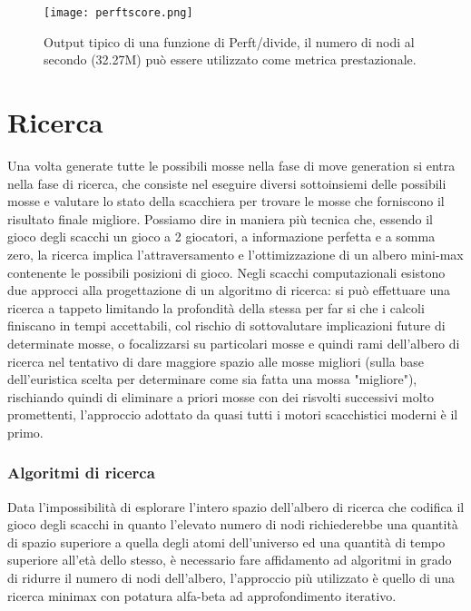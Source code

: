 \begin{figure}[H]
    \centering
    \texttt{[image: perftscore.png]}
    \caption{Output tipico di una funzione di Perft/divide, il numero di nodi al secondo (32.27M) può essere utilizzato come metrica prestazionale.}
    \label{perftscore}
\end{figure}


\section{Ricerca} \label{ricerca}
Una volta generate tutte le possibili mosse nella fase di move generation si entra nella fase di ricerca, che consiste nel eseguire diversi sottoinsiemi delle possibili mosse e valutare
lo stato della scacchiera per trovare le mosse che forniscono il risultato finale migliore. Possiamo dire in maniera più tecnica che, essendo il gioco degli scacchi un gioco
a 2 giocatori, a informazione perfetta e a somma zero, la ricerca implica l'attraversamento e l'ottimizzazione di un albero mini-max contenente le possibili posizioni di gioco.
Negli scacchi computazionali esistono due approcci alla progettazione di un algoritmo di ricerca: si può effettuare una ricerca a tappeto limitando la profondità
della stessa per far si che i calcoli finiscano in tempi accettabili, col rischio di sottovalutare implicazioni future di determinate mosse, o focalizzarsi su particolari mosse e quindi
rami dell'albero di ricerca nel tentativo di dare maggiore spazio alle mosse migliori (sulla base dell'euristica scelta per determinare come sia fatta una mossa "migliore"), rischiando
quindi di eliminare a priori mosse con dei risvolti successivi molto promettenti, l'approccio adottato da quasi tutti i motori scacchistici moderni è il primo.

\subsubsection{Algoritmi di ricerca}
Data l'impossibilità di esplorare l'intero spazio dell'albero di ricerca che codifica il gioco degli scacchi in quanto l'elevato numero di nodi richiederebbe una quantità di spazio superiore
a quella degli atomi dell'universo ed una quantità di tempo superiore all'età dello stesso, è necessario fare affidamento ad algoritmi in
grado di ridurre il numero di nodi dell'albero, l'approccio più utilizzato è quello di una ricerca minimax con potatura alfa-beta ad approfondimento iterativo.


